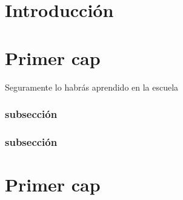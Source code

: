\documentclass[a4paper]{book}
\begin{document}
\tableofcontents
\newpage
\begingroup
\renewcommand*{\addvspace}[1]{}%
\listoffigures
\newpage
\listoftables
\endgroup


\listoffigures
\newpage
\listoftables

\chapter*{Introducción}

\lipsum[2]
\chapter{Primer
cap}
Seguramente lo habrás aprendido en la escuela
\lipsum[1-3]

\subsection{subsección}
\subsection*{subsección}
\lipsum[1-8]

{}


\appendix
\chapter{Primer
cap}
\end{document}
